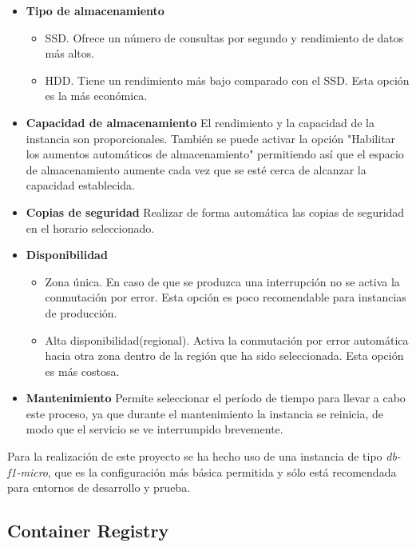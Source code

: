 \begin{itemize}
    \item \textbf{Tipo de almacenamiento}
    \begin{itemize}
        \item SSD. Ofrece un número de consultas por segundo y rendimiento de datos más altos.
        \item HDD. Tiene un rendimiento más bajo comparado con el SSD. Esta opción es la más económica.
    \end{itemize}
    \item \textbf{Capacidad de almacenamiento}
    \newline
    El rendimiento y la capacidad de la instancia son proporcionales. También se puede activar la opción "Habilitar los aumentos automáticos de almacenamiento" permitiendo así que el espacio de almacenamiento aumente cada vez que se esté cerca de alcanzar la capacidad establecida.
    \item \textbf{Copias de seguridad}
    \newline
    Realizar de forma automática las copias de seguridad en el horario seleccionado.
    \item \textbf{Disponibilidad}
     \begin{itemize}
        \item Zona única. En caso de que se produzca una interrupción no se activa la conmutación por error. Esta opción es poco recomendable para instancias de producción.
        \item Alta disponibilidad(regional). Activa la conmutación por error automática hacia otra zona dentro de la región que ha sido seleccionada. Esta opción es más costosa.
    \end{itemize}
    \item \textbf{Mantenimiento}
    \newline
    Permite seleccionar el período de tiempo para llevar a cabo este proceso, ya que durante el mantenimiento la instancia se reinicia, de modo que el servicio se ve interrumpido brevemente.
\end{itemize}

Para la realización de este proyecto se ha hecho uso de una instancia de tipo \textit{db-f1-micro}, que es la configuración más básica permitida y sólo está recomendada para entornos de desarrollo y prueba.

\subsection{Container Registry}

